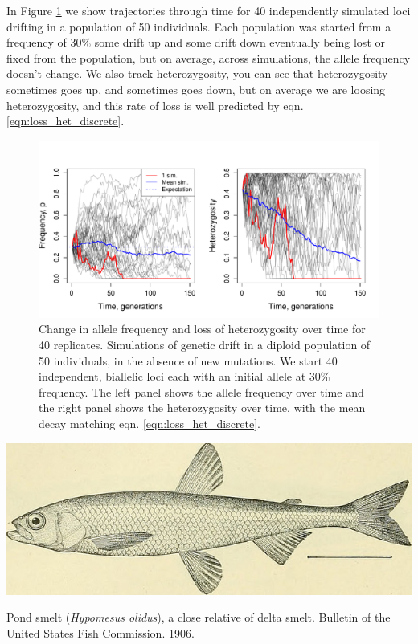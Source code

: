 In Figure \ref{fig:LossHet_WF_N50} we show trajectories through time for 40 independently simulated loci drifting in a population of 50 individuals. Each population was started from a frequency of $30\%$ some drift up and some drift down eventually being lost or fixed from the population, but on average, across simulations, the allele frequency doesn't change. We also track heterozygosity, you can see that heterozygosity sometimes goes up, and sometimes goes down, but on average we are loosing heterozygosity, and this rate of loss is well predicted by eqn. \eqref{eqn:loss_het_discrete}. 
\begin{figure}
\begin{center}
\includegraphics[width= \textwidth]{figures/WF_loss_het/WF_loss_het_N50.pdf}
\end{center}
\caption{Change in allele frequency and loss of heterozygosity over time for 40 replicates. Simulations of genetic drift in a diploid population of 50 individuals, in the absence of new mutations. We start 40 independent, biallelic loci each with an initial allele at 30\% frequency. The left panel shows the allele frequency over time and the right panel shows the heterozygosity over time, with the mean decay matching eqn. \eqref{eqn:loss_het_discrete}.} \label{fig:LossHet_WF_N50}
\end{figure} 


\begin{marginfigure}
\begin{center}
\includegraphics[width= \textwidth]{illustration_images/Genetic_drift/smelt/20497452375_9be855d9ff_z.jpg}
\end{center}
\caption{Pond smelt ({\it Hypomesus olidus}), a close relative of delta smelt. Bulletin of the United States Fish Commission. 1906.} \label{fig:smelt}
\end{marginfigure} 

